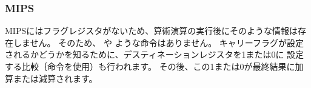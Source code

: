 \subsubsection{MIPS}



MIPSにはフラグレジスタがないため、算術演算の実行後にそのような情報は存在しません。
そのため、 や ような命令はありません。 
キャリーフラグが設定されるかどうかを知るために、デスティネーションレジスタを1または0に
設定する比較｛命令を使用）も行われます。
その後、この1または0が最終結果に加算または減算されます。


